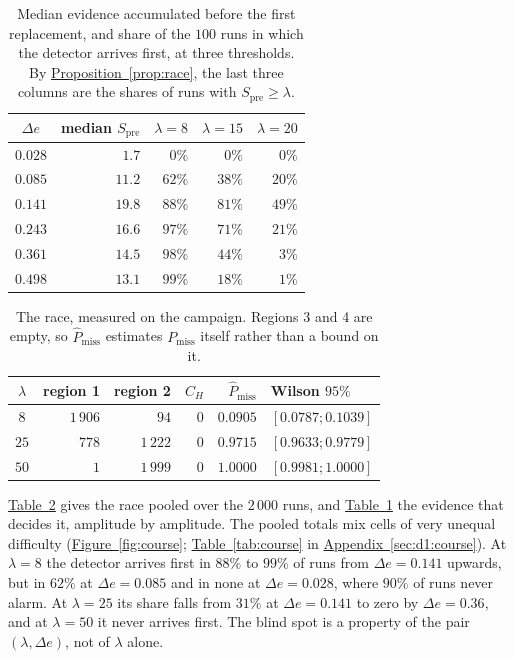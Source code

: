\documentclass[10pt,conference]{IEEEtran}
\theoremstyle{definition}
\begin{document}
\begin{table}[!t]
\centering
\caption{Median evidence accumulated before the first replacement, and share of the $100$
runs in which the detector arrives first, at three thresholds. By
\hyperref[prop:race]{Proposition~\ref*{prop:race}}, the last three columns are the shares of runs with
$S_{\mathrm{pre}} \ge \lambda$.}
\label{tab:spre}
\begin{tabular}{crrrr}
\toprule
$\Delta e$ & median $S_{\mathrm{pre}}$ & $\lambda = 8$ & $\lambda = 15$ & $\lambda = 20$ \\
\midrule
$0.028$ & $1.7$  & $0\%$  & $0\%$  & $0\%$ \\
$0.085$ & $11.2$ & $62\%$ & $38\%$ & $20\%$ \\
$0.141$ & $19.8$ & $88\%$ & $81\%$ & $49\%$ \\
$0.243$ & $16.6$ & $97\%$ & $71\%$ & $21\%$ \\
$0.361$ & $14.5$ & $98\%$ & $44\%$ & $3\%$ \\
$0.498$ & $13.1$ & $99\%$ & $18\%$ & $1\%$ \\
\bottomrule
\end{tabular}
\end{table}

\begin{table}[t]
\centering
\caption{The race, measured on the campaign. Regions 3 and 4 are empty, so
$\hat P_{\mathrm{miss}}$ estimates $P_{\mathrm{miss}}$ itself rather than a bound on it.}
\label{tab:race}
\begin{tabular}{crrrrl}
\toprule
$\lambda$ & region 1 & region 2 & $C_H$ & $\hat P_{\mathrm{miss}}$ & Wilson $95\%$ \\
\midrule
$8$  & $1\,906$ & $94$    & $0$ & $0.0905$ & $[0.0787;0.1039]$ \\
$25$ & $778$     & $1\,222$ & $0$ & $0.9715$ & $[0.9633;0.9779]$ \\
$50$ & $1$       & $1\,999$ & $0$ & $1.0000$ & $[0.9981;1.0000]$ \\
\bottomrule
\end{tabular}
\end{table}


\noindent \hyperref[tab:race]{Table~\ref*{tab:race}} gives the race pooled over the $2\,000$ runs, and
\hyperref[tab:spre]{Table~\ref*{tab:spre}} the evidence that decides it, amplitude by amplitude. The pooled totals
mix cells of very unequal difficulty (\hyperref[fig:course]{Figure~\ref*{fig:course}};
\hyperref[tab:course]{Table~\ref*{tab:course}} in \hyperref[sec:d1:course]{Appendix~\ref*{sec:d1:course}}). At $\lambda = 8$ the detector
arrives first in $88\%$ to $99\%$ of runs from $\Delta e = 0.141$ upwards, but in $62\%$ at
$\Delta e = 0.085$ and in none at $\Delta e = 0.028$, where $90\%$ of runs never alarm. At
$\lambda = 25$ its share falls from $31\%$ at $\Delta e = 0.141$ to zero by
$\Delta e = 0.36$, and at $\lambda = 50$ it never arrives first. The blind spot is a property
of the pair $(\lambda, \Delta e)$, not of $\lambda$ alone.
\end{document}

